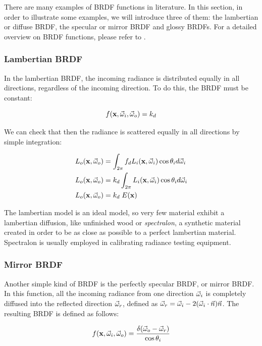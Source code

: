 There are many examples of BRDF functions in literature. In this section, in order to illustrate some examples, we will introduce three of them: the lambertian or diffuse BRDF, the specular or mirror BRDF and glossy BRDFs. For a detailed overview on BRDF functions, please refer to \citep{montes2012overview}.

\subsubsection{Lambertian BRDF}

In the lambertian BRDF, the incoming radiance is distributed equally in all directions, regardless of the incoming direction. To do this, the BRDF must be constant:

$$
f(\mathbf{x}, \vec{\omega}_i, \vec{\omega}_o) = k_d
$$

We can check that then the radiance is scattered equally in all directions by simple integration:

\begin{equation*}
\begin{split}
L_o(\mathbf{x}, \vec{\omega}_o) &= \int_{2\pi} f_d L_i(\mathbf{x}, \vec{\omega}_i) \cos\theta_i d\vec{\omega}_i \\
L_o(\mathbf{x}, \vec{\omega}_o) &= k_d \int_{2\pi} L_i(\mathbf{x}, \vec{\omega}_i) \cos\theta_i d\vec{\omega}_i \\
L_o(\mathbf{x}, \vec{\omega}_o) &= k_d \; E(\mathbf{x}) \\
\end{split}
\end{equation*}

The lambertian model is an ideal model, so very few material exhibit a lambertian diffusion, like unfinished wood or \emph{spectralon}, a synthetic material created in order to be as close as possible to a perfect lambertian material. Spectralon is usually employed in calibrating radiance testing equipment. 

\subsubsection{Mirror BRDF}

Another simple kind of BRDF is the perfectly specular BRDF, or mirror BRDF. In this function, all the incoming radiance from one direction $\vec{\omega}_i$ is completely diffused into the reflected direction $\vec{\omega}_r$, defined as $\vec{\omega}_r = \vec{\omega}_i - 2 (\vec{\omega}_i \cdot \vec{n}) \vec{n}$. The resulting BRDF is defined as follows:

$$
f(\mathbf{x}, \vec{\omega}_i, \vec{\omega}_o) = \frac{\delta(\vec{\omega}_o - \vec{\omega}_r)}{\cos\theta_i} 
$$

